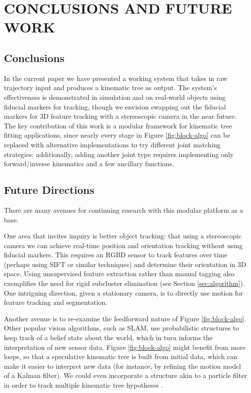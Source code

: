 \documentclass[letterpaper, 10 pt, conference]{ieeeconf}  %
\begin{document}
\section{CONCLUSIONS AND FUTURE WORK} \label{sec:conclusion}

\subsection{Conclusions}
In the current paper we have presented a working system that takes in raw trajectory input and produces a kinematic tree as output. The system's effectiveness is demonstrated in simulation and on real-world objects using fiducial markers for tracking, though we envision swapping out the fiducial markers for 3D feature tracking with a stereoscopic camera in the near future. The key contribution of this work is a modular framework for kinematic tree fitting applications, since nearly every stage in Figure \ref{fig:block-algo} can be replaced with alternative implementations to try different joint matching strategies; additionally, adding another joint type requires implementing only forward/inverse kinematics and a few ancillary functions.

\subsection{Future Directions}\label{sec:future}
There are many avenues for continuing research with this modular platform as a base. 

One area that invites inquiry is better object tracking: that using a stereoscopic camera we can achieve real-time position and orientation tracking without using fiducial markers. This requires an RGBD sensor to track features over time (perhaps using SIFT or similar techniques) and determine their orientation in 3D space. Using unsupervised feature extraction rather than manual tagging also exemplifies the need for rigid subcluster elimination (see Section \ref{sec:algorithm}). One intriguing direction, given a stationary camera, is to directly use motion for feature tracking and segmentation.

Another avenue is to re-examine the feedforward nature of Figure \ref{fig:block-algo}. Other popular vision algorithms, such as SLAM, use probabilistic structures to keep track of a belief state about the world, which in turn informs the interpretation of new sensor data. Figure \ref{fig:block-algo} might benefit from more loops, so that a speculative kinematic tree is built from initial data, which can make it easier to interpret new data (for instance, by refining the motion model of a Kalman filter). We could even incorporate a structure akin to a particle filter in order to track multiple kinematic tree hypotheses \cite{Thrun2002}.
\end{document}
